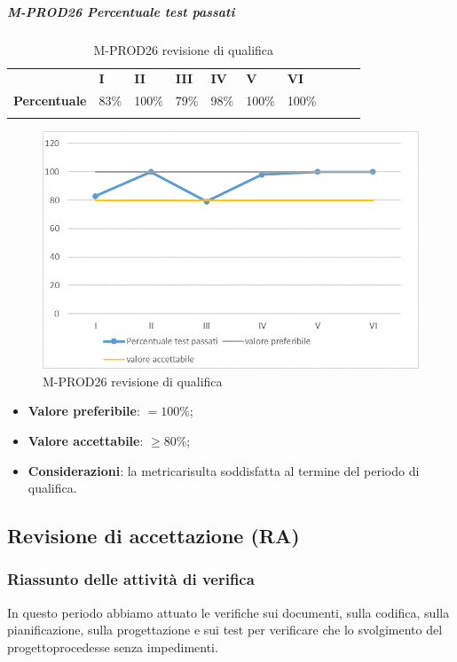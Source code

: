 \subparagraph{M-PROD26 Percentuale test passati} \mbox{}
\begin{longtable}[H!] {						
		>{}p{50mm}  		
		>{}p{8mm}
		>{}p{8mm}		
		>{}p{8mm}		
		>{}p{8mm}		
		>{}p{8mm}		
		>{}p{8mm}
		>{}p{8mm}
		>{}p{8mm}
		>{}p{8mm}
	}
	\rowcolor{gray!50}
	\textbf{} & \textbf{I} & \textbf{II} & \textbf{III} & \textbf{IV} & \textbf{V} & \textbf{VI} \TBstrut \\ [2mm]
	\textbf{Percentuale} & 83\% & 100\% & 79\% & 98\% & 100\% & 100\% \TBstrut \\ [2mm]
	\rowcolor{white}
	\caption{M-PROD26 revisione di qualifica}
\end{longtable}
\begin{figure}[H] 	
	\includegraphics[width=\linewidth]{./img/grafici/RQ26.png}	
	\caption{M-PROD26 revisione di qualifica}	
\end{figure}
\begin{itemize}
	\item \textbf{Valore preferibile}: $= 100\%$;
	\item \textbf{Valore accettabile}: $\ge 80\%$;
	\item \textbf{Considerazioni}: la metrica\glosp risulta soddisfatta al termine del periodo di qualifica.
\end{itemize}


\subsection{Revisione di accettazione (RA)}
\subsubsection{Riassunto delle attività di verifica}
In questo periodo abbiamo attuato le verifiche sui documenti, sulla codifica, sulla pianificazione, sulla progettazione e sui test per verificare che lo svolgimento del progetto\glosp procedesse senza impedimenti.  
